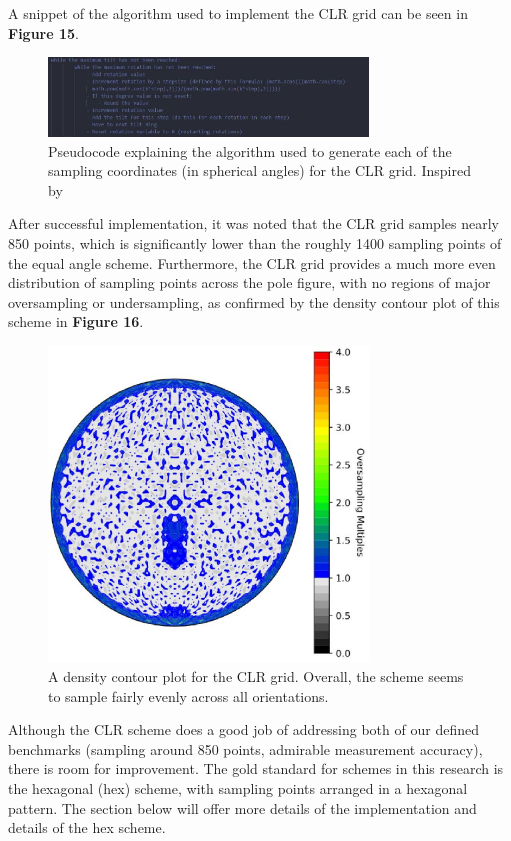\documentclass[10pt]{article}
\begin{document}
A snippet of the algorithm used to implement the CLR grid can be seen in \textbf{Figure 15}.
\begin{figure}[h]
    \centering
    \includegraphics[width=8.5cm]{fig15}
    \caption{\label{tab1}Pseudocode explaining the algorithm used to generate each of the sampling coordinates (in spherical angles) for the 
    CLR grid. Inspired by \cite{ref11}} 
    \end{figure}
 
After successful implementation, it was noted that the CLR grid samples nearly 850 points, which is significantly lower than the 
roughly 1400 sampling points of the equal angle scheme. Furthermore, the CLR grid provides a much more even distribution of sampling points
across the pole figure, with no regions of major oversampling or undersampling, as confirmed by the density contour plot of this scheme in \textbf{Figure 16}.
\begin{figure}[h]
    \centering
    \includegraphics[width=8.5cm]{fig16}
    \caption{\label{tab1}A density contour plot for the CLR grid. Overall, the scheme seems to sample fairly evenly across all orientations.} 
    \end{figure}

Although the CLR scheme does a good job of addressing both of our defined benchmarks (sampling around 850 points, admirable measurement accuracy), 
there is room for improvement. The gold standard for schemes in this research is the hexagonal (hex) scheme, with sampling points arranged in a hexagonal pattern. The section below 
will offer more details of the implementation and details of the hex scheme.
\end{document}
